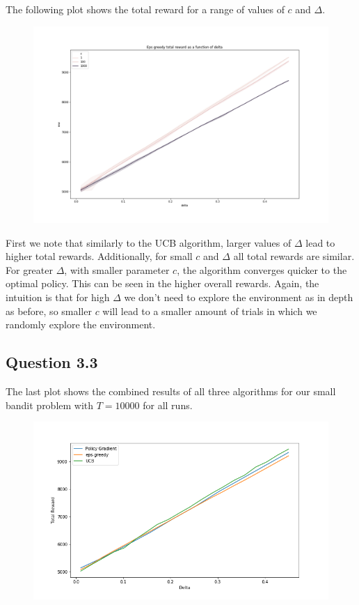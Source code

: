 \documentclass[a4paper, 11pt]{article} %
\begin{document}
The following plot shows the total reward for a range of values of $c$ and $\Delta$.

\begin{figure}[h]
	\centering
	\includegraphics[scale = 1]{Eps_greedy_reward}
	\caption{}
\end{figure}

First we note that similarly to the UCB algorithm, larger values of $\Delta$ lead to higher total rewards. Additionally, for small $c$ and $\Delta$ all total rewards are similar. For greater $\Delta$, with smaller parameter $c$, the algorithm converges quicker to the optimal policy. This can be seen in the higher overall rewards. Again, the intuition is that for high $\Delta$ we don't need to explore the environment as in depth as before, so smaller $c$ will lead to a smaller amount of trials in which we randomly explore the environment. 

\newpage

\subsection*{Question 3.3}

The last plot shows the combined results of all three algorithms for our small bandit problem with $T=10000$ for all runs. 

\begin{figure}[h]
	\centering
	\includegraphics[scale = 0.65]{algorithms_comparison}
	\caption{}
\end{figure}
\end{document}
